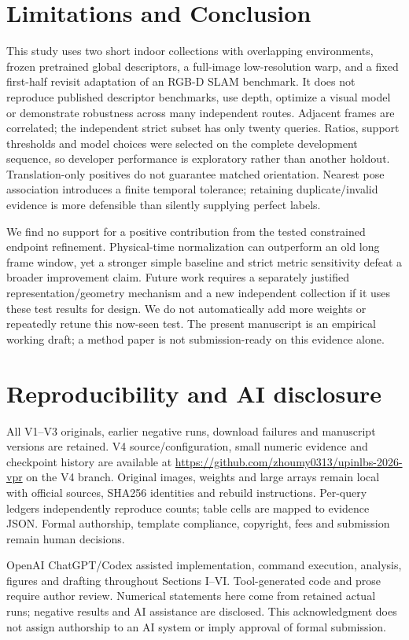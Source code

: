 \documentclass[conference,letterpaper]{IEEEtran}
\begin{document}
\section{Limitations and Conclusion}
This study uses two short indoor collections with overlapping environments, frozen pretrained global descriptors, a full-image low-resolution warp, and a fixed first-half revisit adaptation of an RGB-D SLAM benchmark. It does not reproduce published descriptor benchmarks, use depth, optimize a visual model or demonstrate robustness across many independent routes. Adjacent frames are correlated; the independent strict subset has only twenty queries. Ratios, support thresholds and model choices were selected on the complete development sequence, so developer performance is exploratory rather than another holdout. Translation-only positives do not guarantee matched orientation. Nearest pose association introduces a finite temporal tolerance; retaining duplicate/invalid evidence is more defensible than silently supplying perfect labels.

We find no support for a positive contribution from the tested constrained endpoint refinement. Physical-time normalization can outperform an old long frame window, yet a stronger simple baseline and strict metric sensitivity defeat a broader improvement claim. Future work requires a separately justified representation/geometry mechanism and a new independent collection if it uses these test results for design. We do not automatically add more weights or repeatedly retune this now-seen test. The present manuscript is an empirical working draft; a method paper is not submission-ready on this evidence alone.

\section*{Reproducibility and AI disclosure}
All V1--V3 originals, earlier negative runs, download failures and manuscript versions are retained. V4 source/configuration, small numeric evidence and checkpoint history are available at \url{https://github.com/zhoumy0313/upinlbs-2026-vpr} on the V4 branch. Original images, weights and large arrays remain local with official sources, SHA256 identities and rebuild instructions. Per-query ledgers independently reproduce counts; table cells are mapped to evidence JSON. Formal authorship, template compliance, copyright, fees and submission remain human decisions.

OpenAI ChatGPT/Codex assisted implementation, command execution, analysis, figures and drafting throughout Sections I--VI. Tool-generated code and prose require author review. Numerical statements here come from retained actual runs; negative results and AI assistance are disclosed. This acknowledgment does not assign authorship to an AI system or imply approval of formal submission.
\end{document}
